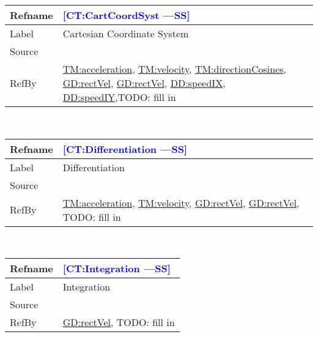 \documentclass[12pt]{article}
\newcommand{\authornote}[3]{\textcolor{#1}{[#3 ---#2]}}
\newcommand{\authornote}[3]{}
\newcommand{\wss}[1]{\authornote{blue}{SS}{#1}}
\begin{document}
\medskip
\noindent
\begin{minipage}{\textwidth}
\begin{tabular}{>{\raggedright}p{}>{\raggedright\arraybackslash}p{}}
\toprule \textbf{Refname} & \textbf{\wss{CT:CartCoordSyst}}
\label{CT:CartCoordSyst}
\\ \midrule
Label & Cartesian Coordinate System
\\ \midrule
Source & \cite{}
\\ \midrule
RefBy & \hyperref[TM:acceleration]{TM:acceleration},
\hyperref[TM:velocity]{TM:velocity},
\hyperref[TM:directionCosines]{TM:directionCosines},
\hyperref[GD:rectVel]{GD:rectVel}, \hyperref[GD:rectVel]{GD:rectVel}, \hyperref[DD:speedIX]{DD:speedIX}, \hyperref[DD:speedIY]{DD:speedIY},TODO: fill in
\\ \bottomrule
\end{tabular}
\end{minipage}
~\\

\medskip
\noindent
\begin{minipage}{\textwidth}
\begin{tabular}{>{\raggedright}p{}>{\raggedright\arraybackslash}p{}}
\toprule \textbf{Refname} & \textbf{\wss{CT:Differentiation}}
\label{CT:Differentiation}
\\ \midrule
Label & Differentiation
\\ \midrule
Source & \cite{}
\\ \midrule
RefBy & \hyperref[TM:acceleration]{TM:acceleration},
\hyperref[TM:velocity]{TM:velocity}, \hyperref[GD:rectVel]{GD:rectVel}, \hyperref[GD:rectVel]{GD:rectVel}, TODO:
fill in 
\\ \bottomrule
\end{tabular}
\end{minipage}
~\\

\medskip
\noindent
\begin{minipage}{\textwidth}
\begin{tabular}{>{\raggedright}p{}>{\raggedright\arraybackslash}p{}}
\toprule \textbf{Refname} & \textbf{\wss{CT:Integration}}
\label{CT:Integration}
\\ \midrule
Label & Integration
\\ \midrule
Source & \cite{}
\\ \midrule
RefBy & \hyperref[GD:rectVel]{GD:rectVel}, TODO: fill in
\\ \bottomrule
\end{tabular}
\end{minipage}
~\\
\end{document}
